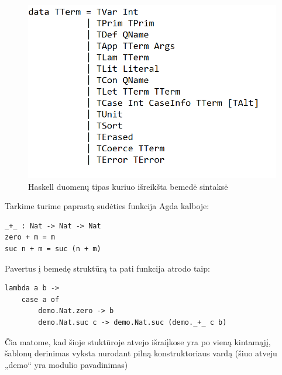 \documentclass{VUMIFPSkursinis}
\begin{document}
\begin{itemize}
		\begin{figure}[H]
			\centering
			\includegraphics[scale=0.75]{TreelessTerm.png}
			\caption{Haskell duomenų tipas kuriuo išreikšta bemedė sintaksė}
			\label{img:tterm}
			\centering
			\end{figure}
\end{itemize}
Tarkime turime paprastą sudėties funkcija Agda kalboje:
\begin{lstlisting}
_+_ : Nat -> Nat -> Nat
zero + m = m
suc n + m = suc (n + m)
\end{lstlisting}
Pavertus į bemedę struktūrą ta pati funkcija atrodo taip:
\begin{lstlisting}
lambda a b ->
	case a of
		demo.Nat.zero -> b
		demo.Nat.suc c -> demo.Nat.suc (demo._+_ c b)
\end{lstlisting}
Čia matome, kad šioje stuktūroje atvejo išraiįkose yra po vieną kintamąjį, šablonų derinimas vyksta nurodant pilną konstruktoriaus vardą (šiuo atveju „demo“ yra modulio pavadinimas)
\end{document}
